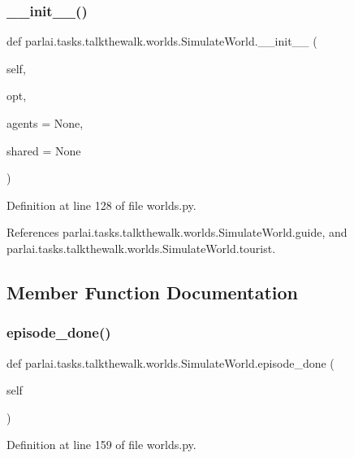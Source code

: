 \subsubsection{\texorpdfstring{\+\_\+\+\_\+init\+\_\+\+\_\+()}{\_\_init\_\_()}}
{\footnotesize\ttfamily def parlai.\+tasks.\+talkthewalk.\+worlds.\+Simulate\+World.\+\_\+\+\_\+init\+\_\+\+\_\+ (\begin{DoxyParamCaption}\item[{}]{self,  }\item[{}]{opt,  }\item[{}]{agents = {\ttfamily None},  }\item[{}]{shared = {\ttfamily None} }\end{DoxyParamCaption})}



Definition at line 128 of file worlds.\+py.



References parlai.\+tasks.\+talkthewalk.\+worlds.\+Simulate\+World.\+guide, and parlai.\+tasks.\+talkthewalk.\+worlds.\+Simulate\+World.\+tourist.



\subsection{Member Function Documentation}
\mbox{\label{classparlai_1_1tasks_1_1talkthewalk_1_1worlds_1_1SimulateWorld_a617e95ecc8ed3dd19c3cc391c4129b42}} 
\subsubsection{\texorpdfstring{episode\+\_\+done()}{episode\_done()}}
{\footnotesize\ttfamily def parlai.\+tasks.\+talkthewalk.\+worlds.\+Simulate\+World.\+episode\+\_\+done (\begin{DoxyParamCaption}\item[{}]{self }\end{DoxyParamCaption})}



Definition at line 159 of file worlds.\+py.



